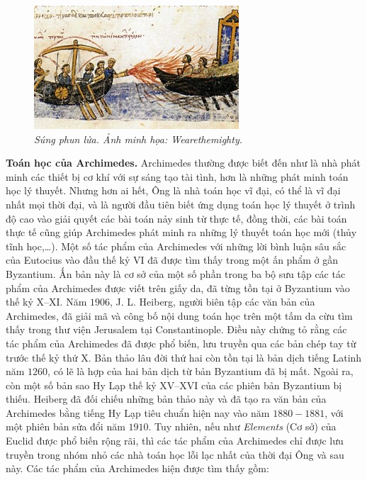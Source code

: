 \begin{multicols}{2}
\begin{figure}[H]
		\includegraphics[width= 1\linewidth]{5}
		\caption{\small\textit{\color{lichsutoanhoc}Súng phun lửa. Ảnh minh họa: Wearethemighty.}}
		\vspace*{-10pt}
	\end{figure}
	\textbf{\color{lichsutoanhoc}Toán học của Archimedes.} Archimedes thường được biết đến như là nhà phát minh các thiết bị cơ khí với sự sáng tạo tài tình, hơn là những phát minh toán học lý thuyết. Nhưng hơn ai hết, Ông là nhà toán học vĩ đại, có thể là vĩ đại nhất mọi thời đại, và là người đầu tiên biết ứng dụng toán học lý thuyết ở trình độ cao vào giải quyết các bài toán nảy sinh từ thực tế, đồng thời, các bài toán thực tế cũng giúp Archimedes phát minh ra những lý thuyết toán học mới (thủy tĩnh học,\ldots).
	\vskip 0.1cm 
	Một số tác phẩm của Archimedes với những lời bình luận sâu sắc của Eutocius vào đầu thế kỷ VI đã được tìm thấy trong một ấn phẩm ở gần Byzantium. Ấn bản này là cơ sở của một số phần trong ba bộ sưu tập các tác phẩm của Archimedes được viết trên giấy da, đã từng tồn tại ở Byzantium vào thế kỷ X--XI. Năm $1906$, J. L. Heiberg, người biên tập các văn bản của Archimedes, đã giải mã và công bố nội dung toán học trên một tấm da cừu tìm thấy trong thư viện Jerusalem tại Constantinople. Điều này chứng tỏ rằng các tác phẩm của Archimedes đã được phổ biến, lưu truyền qua các bản chép tay từ trước thế kỷ thứ X. Bản thảo lâu đời thứ hai còn tồn tại là bản dịch tiếng Latinh năm $1260$, có lẽ là hợp của hai bản dịch từ bản Byzantium đã bị mất. Ngoài ra, còn một số bản sao Hy Lạp thế kỷ XV--XVI của các phiên bản Byzantium bị thiếu. Heiberg đã đối chiếu những bản thảo này và đã tạo ra văn bản của Archimedes bằng tiếng Hy Lạp tiêu chuẩn hiện nay vào năm $1880-1881$, với một phiên bản sửa đổi năm $1910$. Tuy nhiên, nếu như  \textit{Elements} (Cơ sở) của Euclid được phổ biến rộng rãi, thì các tác phẩm của Archimedes chỉ được lưu truyền trong nhóm nhỏ các nhà toán học lỗi lạc nhất của thời đại Ông và sau này. Các tác phẩm của Archimedes hiện được tìm thấy gồm:

\end{multicols}
